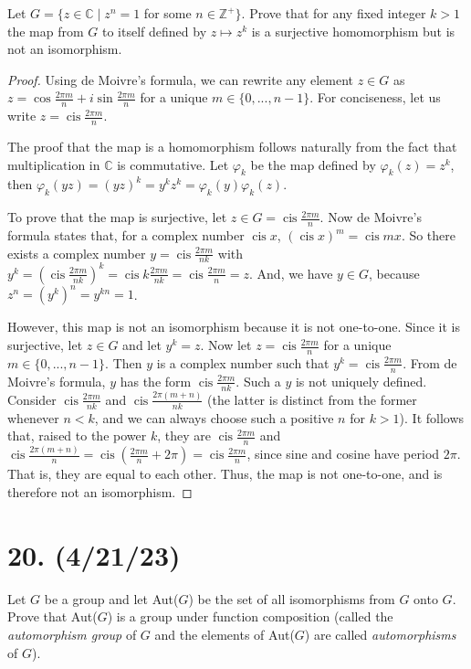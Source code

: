 \documentclass{article}
\DeclareMathOperator\cis{cis}
\begin{document}
Let $G = \{z \in \mathbb{C} \mid z^n = 1$ for some $n \in \mathbb{Z}^+ \}$. Prove that for any fixed integer $k > 1$ the map from $G$ to itself defined by $z \mapsto z^k$ is a surjective homomorphism but is not an isomorphism.

\begin{proof}
    Using de Moivre's formula, we can rewrite any element $z \in G$ as $z = \cos{\frac{2\pi m}{n}} + i \sin{\frac{2\pi m}{n}}$ for a unique $m \in \{0, ..., n - 1\}$. For conciseness, let us write $z = \cis{\frac{2 \pi m}{n}}$.

    The proof that the map is a homomorphism follows naturally from the fact that multiplication in $\mathbb{C}$ is commutative. Let $\varphi_k$ be the map defined by $\varphi_k(z) = z^k$, then $\varphi_k(yz) = (yz)^k = y^k z^k = \varphi_k(y) \varphi_k(z)$.

    To prove that the map is surjective, let $z \in G = \cis{\frac{2 \pi m}{n}}$. Now de Moivre's formula states that, for a complex number $\cis{x}$, $(\cis{x})^m = \cis{mx}$. So there exists a complex number $y = \cis{\frac{2 \pi m}{nk}}$ with $y^k = (\cis{\frac{2 \pi m}{nk}})^k = \cis{k \frac{2 \pi m}{nk}} = \cis{\frac{2 \pi m}{n}} = z$. And, we have $y \in G$, because $z^n = (y^k)^n = y^{kn} = 1$.

    However, this map is not an isomorphism because it is not one-to-one. Since it is surjective, let $z \in G$ and let $y^k = z$. Now let $z = \cis{\frac{2 \pi m}{n}}$ for a unique $m \in \{0, ..., n - 1\}$. Then $y$ is a complex number such that $y^k = \cis{\frac{2 \pi m}{n}}$. From de Moivre's formula, $y$ has the form $\cis{\frac{2 \pi m}{nk}}$. Such a $y$ is not uniquely defined. Consider $\cis{\frac{2 \pi m}{nk}}$ and $\cis{\frac{2 \pi (m + n)}{nk}}$ (the latter is distinct from the former whenever $n < k$, and we can always choose such a positive $n$ for $k > 1$). It follows that, raised to the power $k$, they are $\cis{\frac{2 \pi m}{n}}$ and $\cis{\frac{2 \pi (m + n)}{n}} = \cis{(\frac{2 \pi m}{n} + 2 \pi)} = \cis{\frac{2 \pi m}{n}}$, since sine and cosine have period $2 \pi$. That is, they are equal to each other. Thus, the map is not one-to-one, and is therefore not an isomorphism.
\end{proof}

\section*{20. (4/21/23)}

Let $G$ be a group and let Aut($G$) be the set of all isomorphisms from $G$ onto $G$. Prove that Aut($G$) is a group under function composition (called the \emph{automorphism group} of $G$ and the elements of Aut($G$) are called \emph{automorphisms} of $G$).
\end{document}
